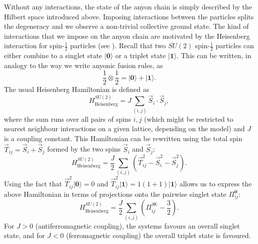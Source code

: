 Without any interactions, the state of the anyon chain is simply described by the Hilbert space introduced above. Imposing interactions between the particles splits the degeneracy and we observe a non-trivial collective ground state. The kind of interactions that we impose on the anyon chain are motivated by the Heisenberg interaction for spin-$\frac{1}{2}$ particles (see \cite{Trebst2008}). Recall that two $SU(2)$ spin-$\frac{1}{2}$ particles can either combine to a singlet state $|\mathbf{0}\rangle$ or a triplet state $|\mathbf{1}\rangle$. This can be written, in analogy to the way we write anyonic fusion rules, as
	\begin{equation}
		\frac{1}{2}\otimes\frac{1}{2}=|\mathbf{0}\rangle+|\mathbf{1}\rangle.
	\end{equation}
The usual Heisenberg Hamiltonian is defined as
	\begin{equation}
		H_\mathrm{Heisenberg}^{SU(2)}=J\sum_{(i,j)}\vec{S}_i\cdot\vec{S}_j,
	\end{equation}
where the sum runs over all pairs of spins $i,j$ (which might be restricted to nearest neighbour interactions on a given lattice, depending on the model) and $J$ is a coupling constant. This Hamiltonian can be rewritten using the total spin $\vec{T}_{ij}=\vec{S}_i+\vec{S}_j$ formed by the two spins $\vec{S}_i$ and $\vec{S}_j$:
	\begin{equation}
		H_\mathrm{Heisenberg}^{SU(2)}=\frac{J}{2}\sum_{(i,j)}\left(\vec{T}_{ij}^2-\vec{S}_i^2-\vec{S}_j^2\right).
	\end{equation}
Using the fact that $\vec{T}_{ij}^2|\mathbf{0}\rangle=0$ and $\vec{T}_{ij}^2|\mathbf{1}\rangle=1(1+1)|\mathbf{1}\rangle$ allows us to express the above Hamiltonian in terms of projections onto the pairwise singlet state $\Pi_{ij}^\mathbf{0}$:
	\begin{equation}
		H_\mathrm{Heisenberg}^{SU(2)}=\frac{J}{2}\sum_{(i,j)}\left( \Pi_{ij}^{|\mathbf{0}\rangle}-\frac{3}{2}\right).
	\end{equation}
For $J>0$ (antiferromagnetic coupling), the systems favours an overall singlet state, and for $J<0$ (ferromagnetic coupling) the overall triplet state is favoured.

